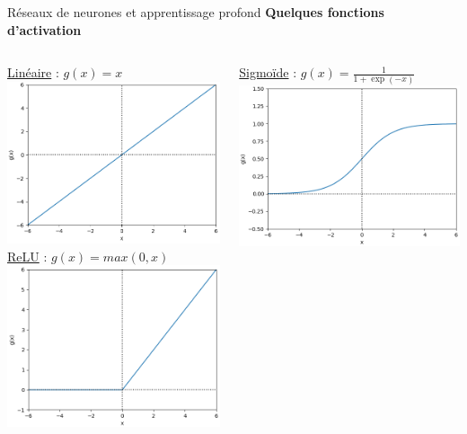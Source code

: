 \documentclass[french]{beamer}
\begin{document}
\begin{frame}{Réseaux de neurones et apprentissage profond}
\textbf{Quelques fonctions d'activation}
\vspace{-.5cm}
\begin{columns}[T]
\begin{column}{.48\textwidth}
\begin{center}
\underline{Linéaire} : $g(x) = x$\\
\includegraphics[width=.6\linewidth]{figures/linear}\\
\underline{ReLU} : $g(x) = max(0, x)$\\
\includegraphics[width=.6\linewidth]{figures/relu}\\
\end{center}
\end{column}
\hfill
\begin{column}{.48\textwidth}
\begin{center}
\underline{Sigmoïde} : $g(x) = \frac{1}{1 + \exp (-x)}$\\
\includegraphics[width=.6\linewidth]{figures/sigmoid}\\

\end{center}
\end{column}
\end{columns}
\end{frame}
\end{document}
